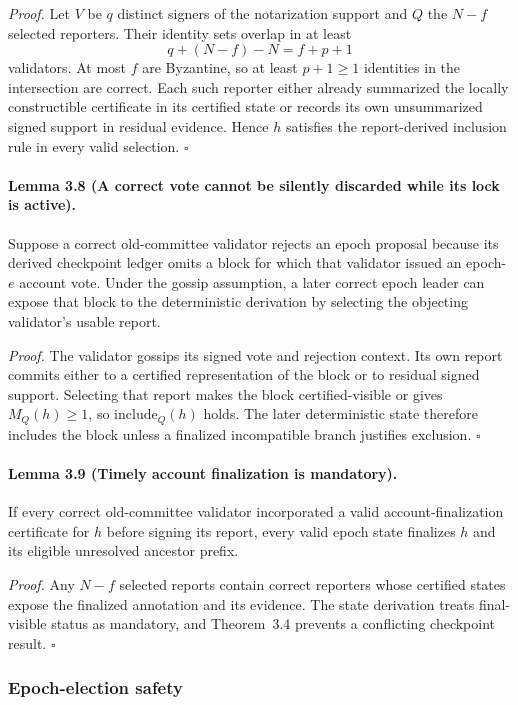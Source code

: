 \documentclass[10pt,twocolumn]{article}
\newcommand{\Include}{\mathrm{include}}
\begin{document}
\emph{Proof.} Let $V$ be $q$ distinct signers of the notarization support and $Q$ the $N-f$ selected reporters. Their identity sets overlap in at least
\begin{equation}
q+(N-f)-N=f+p+1
\end{equation}
validators. At most $f$ are Byzantine, so at least $p+1\ge1$ identities in the intersection are correct. Each such reporter either already summarized the locally constructible certificate in its certified state or records its own unsummarized signed support in residual evidence. Hence $h$ satisfies the report-derived inclusion rule in every valid selection. $\square$

\paragraph{Lemma 3.8 (A correct vote cannot be silently discarded while its lock is active).} Suppose a correct old-committee validator rejects an epoch proposal because its derived checkpoint ledger omits a block for which that validator issued an epoch-$e$ account vote. Under the gossip assumption, a later correct epoch leader can expose that block to the deterministic derivation by selecting the objecting validator's usable report.

\emph{Proof.} The validator gossips its signed vote and rejection context. Its own report commits either to a certified representation of the block or to residual signed support. Selecting that report makes the block certified-visible or gives $M_Q(h)\ge1$, so $\Include_Q(h)$ holds. The later deterministic state therefore includes the block unless a finalized incompatible branch justifies exclusion. $\square$

\paragraph{Lemma 3.9 (Timely account finalization is mandatory).} If every correct old-committee validator incorporated a valid account-finalization certificate for $h$ before signing its report, every valid epoch state finalizes $h$ and its eligible unresolved ancestor prefix.

\emph{Proof.} Any $N-f$ selected reports contain correct reporters whose certified states expose the finalized annotation and its evidence. The state derivation treats final-visible status as mandatory, and Theorem~3.4 prevents a conflicting checkpoint result. $\square$

\subsubsection{Epoch-election safety}
\end{document}
